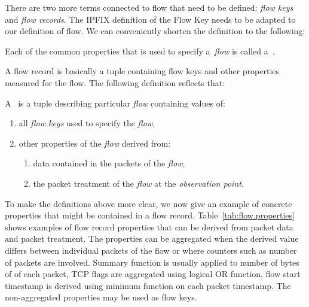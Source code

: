 There are two more terms connected to flow that need to be defined: \emph{flow keys} and \emph{flow records}. The IPFIX definition of the Flow Key needs to be adapted to our definition of flow. We can conveniently shorten the definition to the following:

\begin{definition}\label{def:flow-key}

    Each of the common properties that is used to specify a~\emph{flow} is called a~\emph{}.

\end{definition}

A flow record is basically a tuple containing flow keys and other properties measured for the flow. The following definition reflects that:

\begin{definition}\label{def:flow-record}

    A~\emph{} is a tuple describing particular \emph{flow} containing values of:

    \begin{enumerate}
    	\item all \emph{flow keys} used to specify the \emph{flow},
    	\item other properties of the \emph{flow} derived from:
    	\begin{enumerate}
    		\item data contained in the packets of the \emph{flow},
    		\item the packet treatment of the \emph{flow} at the \emph{observation point}.
    	\end{enumerate}
    \end{enumerate}

\end{definition}

To make the definitions above more clear, we now give an example of concrete properties that might be contained in a flow record. Table~\ref{tab:flow.properties} shows examples of flow record properties that can be derived from packet data and packet treatment. The properties can be aggregated when the derived value differs between individual packets of the flow or where counters such as number of packets are involved. Summary function is usually applied to number of bytes of of each packet, TCP flags are aggregated using logical OR function, flow start timestamp is derived using minimum function on each packet timestamp. The non-aggregated properties may be used as flow keys.

